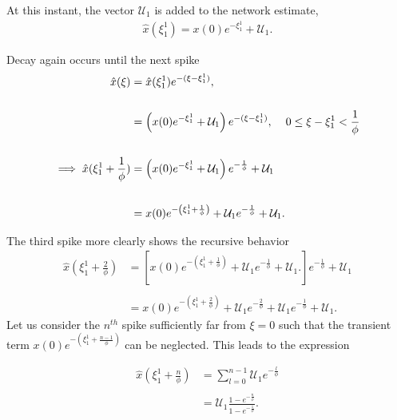 \begin{enumerate}
 At this instant, the  vector $\mathcal{U}_1$ is added to the network estimate,
 \begin{align*}
 \hat{x}( \xi_1^1) =  x(0) e^{-\xi_1^1 } + \mathcal{U}_1.
 \end{align*}
 
Decay again occurs until the next spike
\begin{align*}
\hat{
	x
}
(
	\xi
)
&= \hat
{
	x
}
(
	\xi_{1}^1
)
e^
{
	-
	(
		\xi - \xi_{1}^1
	)
},
%
\\
\\
%
&=
\left(
	 x(0) e^
	 {
	 	-\xi_1^1
	 }
	 +
	 \mathcal{U}_1
\right)
e^
{
	-
	(
		\xi - 
		\xi_1^1
	)
} , \hspace{4mm} 
0 \leq \xi - \xi_1^1 <
\frac
{
	1
}
{
	\phi
}
%
\\
\\
%
\implies
\hat
{
	x
}
(
	\xi_1^1 + 
	\frac
	{
		1
	}
	{
		\phi
	}
)
&=
\left(
	x
	(
		0
	)
	e^
	{
		- \xi_1^1
	}
	 +
	 \mathcal{U}_1 
\right)
e^
{
	-
	\frac
	{
		1
	}
	{
		\phi
	}
}
+
\mathcal{U}_1
\\
\\
&=
x
(
	0
)
e^
{	
	-\left(
		\xi_1^1 + 
		\frac
		{
			1
		}
		{
			\phi
		}
	\right)
}
+
\mathcal{U}_1
e^
{
	-\frac
	{
		1
	}
	{
		\phi
	}
} 
+
\mathcal{U}_1.
\end{align*}

The third spike more clearly shows the recursive behavior
\begin{align*}
\hat
{
	x
}
(
	\xi_1^1 + 
	\frac
	{
		2
	}
	{
		\phi
	}
)
&= 
\left[
	x
	(
		0
	)
	e^
	{	
		-\left(
			\xi_1^1 + 
			\frac
			{
				1
			}
			{
				\phi
			}
		\right)
	}
	+
	\mathcal{U}_1
	e^
	{
		-\frac
		{
			1
		}
		{
			\phi
		}
	} 
	+
	\mathcal{U}_1.
\right]
e^
{
	-\frac
	{
		1
	}
	{
			\phi
	}
}
+
\mathcal{U}_1 
%
\\
\\
%
&= 
x
(
	0
)
e^
{	
	-\left(
		\xi_1^1 + 
		\frac
		{
			2
		}
		{
			\phi
		}
	\right)
}
+
\mathcal{U}_1
e^
{
	-\frac
	{
		2
	}
	{
		\phi
	}
} 
+
\mathcal{U}_1
e^
{
	-\frac
	{
		1
	}
	{
			\phi
	}
}
+
\mathcal{U}_1.
\end{align*}
Let us consider the $n^{th}$ spike sufficiently far from $\xi=0$ such that the transient term $
x
(
	0
)
e^
{
	-\left(
		\xi_1^1	+ 
		\frac
		{
			n-1
		}
		{
			\phi
		}
	\right)
}
$ can be neglected. This leads to the expression

\begin{align*}
\hat
{
	x
}
\left(
	\xi_1^1 + 
	\frac
	{
		n
	}
	{
		\phi
	}
\right)
&=
\sum_
{
	l=0
}
^
{
n-1
}
\mathcal{U}_1
e^
{
	- \frac
	{
		l
	}
	{
		\phi
	}
}
%
\\
\\
%
&=
\mathcal{U}_1
\frac
{
	1 - e^
	{
		-\frac
		{
			n
		}
		{
			\phi
		}
	}  
}
{
	1 - e^
	{
		-\frac
		{
			1
		}
		{
			\phi
		}
	}  
}.
\end{align*}


\end{enumerate}
